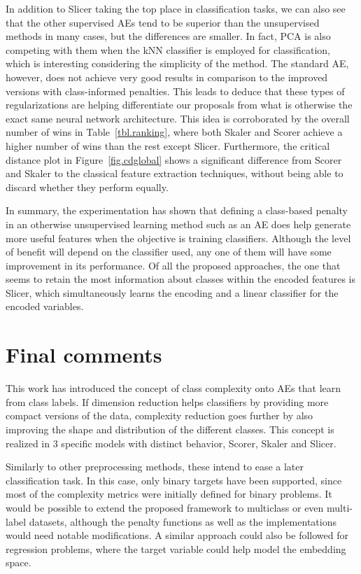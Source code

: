 \documentclass[
	fontsize=11pt, %
	twoside=false, %
	open=any, %
	secnumdepth=1, %
]{kaobook}
\newcommand{\change}[1]{{\color{blue}#1}}
\renewcommand{\change}[1]{#1}
\newcommand{\rechange}[1]{{\color{blue}#1}}
\renewcommand{\rechange}[1]{#1}
\begin{document}
In addition to Slicer taking the top place in classification tasks, we can also see that the other supervised AEs tend to be superior than the unsupervised methods in many cases, but the differences are smaller. In fact, PCA is also competing with them when the kNN classifier is employed for classification, which is interesting considering the simplicity of the method. The standard AE, however, does not achieve very good results in comparison to the improved versions with class-informed penalties. This leads to deduce that these types of regularizations are helping differentiate our proposals from what is otherwise the exact same neural network architecture. This idea is corroborated by the overall number of wins in Table~\ref{tbl.ranking}, where both Skaler and Scorer achieve a higher number of wins than the rest except Slicer.  Furthermore, the critical distance plot in Figure~\ref{fig.cdglobal} shows a significant difference from Scorer and Skaler to the classical feature extraction techniques, without being able to discard whether they perform equally.

In summary, the experimentation has shown that defining a class-based penalty in an otherwise unsupervised learning method such as an AE does help generate more useful features when the objective is training classifiers. Although the level of benefit will depend on the classifier used, any one of them will have some improvement in its performance. Of all the proposed approaches, the one that seems to retain the most information about classes within the encoded features is Slicer, which simultaneously learns the encoding and a linear classifier for the encoded variables.


\section{Final comments}\label{sec.comments}

\change{This work has introduced the concept of class complexity onto AEs that learn from class labels}. If dimension reduction helps classifiers by providing more compact versions of the data, complexity reduction goes further by also improving the shape and distribution of the different classes. \change{This concept} is realized in 3 specific models with distinct behavior, Scorer, Skaler and Slicer. 

\rechange{Similarly to other preprocessing methods, these intend to ease a later classification task.} In this case, only binary targets have been supported, since most of the complexity metrics were initially defined for binary problems. It would be possible to extend the proposed framework to multiclass or even multi-label datasets, although the penalty functions as well as the implementations would need notable modifications. A similar approach could also be followed for regression problems, where the target variable could help model the embedding space.
\end{document}
